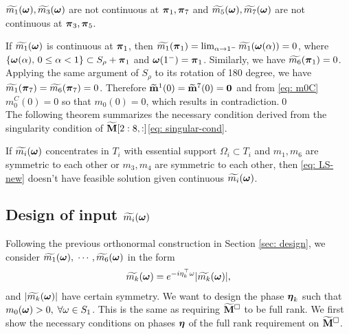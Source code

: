 \begin{proposition}
$\widetilde{m_{1}}(\boldsymbol{\omega}),\widetilde{m_{3}}(\boldsymbol{\omega})$ are not continuous at $\boldsymbol{\pi}_1,\boldsymbol{\pi}_7$ and $\widetilde{m_{5}}(\boldsymbol{\omega}),\widetilde{m_{7}}(\boldsymbol{\omega})$ are not continuous at $\boldsymbol{\pi}_3,\boldsymbol{\pi}_5$.
\end{proposition}
If $\widetilde{m_{1}}(\boldsymbol{\omega})$ is continuous at $\boldsymbol{\pi}_1$, then $\widetilde{m_1}(\boldsymbol{\pi}_1) = \lim_{\alpha\rightarrow 1^-}\widetilde{m_1}(\boldsymbol{\omega}(\alpha)) = 0$, where $\{\boldsymbol{\omega}(\alpha),\,0\leq \alpha<1\} \subset S_\rho + \boldsymbol{\pi}_1$ and $\boldsymbol{\omega}(1^-) = \boldsymbol{\pi}_1$. Similarly, we have $\widetilde{m_6}(\boldsymbol{\pi}_1) = 0$. Applying the same argument of $S_\rho$ to its rotation of 180 degree, we have $\widetilde{m_1}(\boldsymbol{\pi}_7) = \widetilde{m_6}(\boldsymbol{\pi}_7) = 0$. Therefore $\widetilde{\mathbf{m}}^{1}(0) = \widetilde{\mathbf{m}}^{7}(0) = \mathbf{0}$ and from \eqref{eq: m0C} $m_0^C(0)=0$ so that $m_0(0)=0$, %
 which results in contradiction.\qed\\[1em]
The following theorem summarizes the necessary condition derived from the singularity condition of $\widetilde{\mathbf{M}}[2:8,:] $\eqref{eq: singular-cond}. 
\begin{theorem}\label{thm: thm}
If  $\widetilde{m_{i}}(\boldsymbol{\omega})$ concentrates in $T_i$ with essential support $\Omega_i\subset T_i$ and $m_1,m_6$ are symmetric to each other or $m_3,m_4$ are symmetric to each other,  then  \eqref{eq: LS-new} doesn't have feasible solution given continuous $\widetilde{m_{i}}(\boldsymbol{\omega})$.
\end{theorem}

\subsection{Design of input $\widetilde{m_{i}}(\boldsymbol{\omega})$}\label{sec: phase-design}
Following the previous orthonormal construction in Section \ref{sec: design}, we consider $\widetilde{m_{1}}(\boldsymbol{\omega}),$ $\cdots,\widetilde{m_{6}}(\boldsymbol{\omega})$ in the form 
\begin{align}\label{eq: m-form}
\widetilde{m_{k}}(\boldsymbol{\omega}) = e^{-i\eta_k^\top\omega}|\widetilde{m_{k}}(\boldsymbol{\omega})|,
\end{align}
 and $|\widetilde{m_{k}}(\boldsymbol{\omega})|$ have certain symmetry. We want to design the phase $\boldsymbol{\eta}_k$ such that $m_0(\boldsymbol{\omega}) > 0, \; \forall \omega\in S_1$. This is the same as requiring $\widetilde{\mathbf{M}}^{\Box}$ to be full rank.
 We first show the necessary conditions on phases $\boldsymbol{\eta}$ of the full rank requirement on $\widetilde{\mathbf{M}}^{\Box}$.
 
